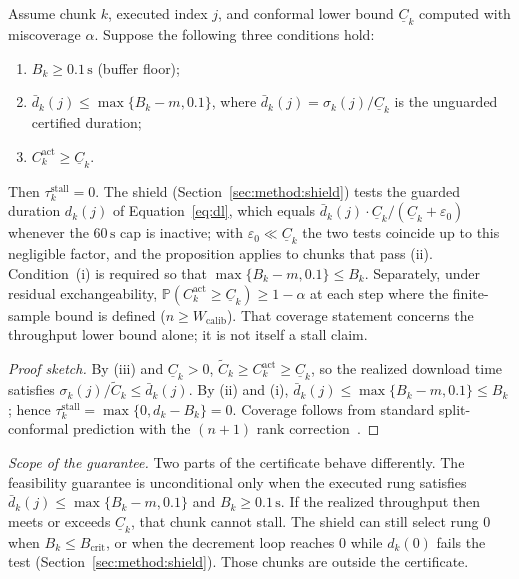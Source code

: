 \begin{proposition}
\label{prop:feas}
Assume chunk \(k\), executed index \(j\), and conformal lower bound \(\underline{C}_k\) computed with miscoverage \(\alpha\).
Suppose the following three conditions hold:
\begin{enumerate}
  \item[(i)] \(B_k\ge 0.1\,\mathrm{s}\) (buffer floor);
  \item[(ii)] \(\bar{d}_k(j)\le\max\{B_k-m,0.1\}\), where \(\bar{d}_k(j)=\sigma_k(j)/\underline{C}_k\) is the unguarded certified duration;
  \item[(iii)] \(C^{\mathrm{act}}_k\ge\underline{C}_k\).
\end{enumerate}
Then \(\tau^{\mathrm{stall}}_k=0\).
The shield (Section~\ref{sec:method:shield}) tests the guarded duration \(d_k(j)\) of Equation~\eqref{eq:dl}, which equals \(\bar{d}_k(j)\cdot\underline{C}_k/(\underline{C}_k+\varepsilon_0)\) whenever the \(60\,\mathrm{s}\) cap is inactive; with \(\varepsilon_0\ll\underline{C}_k\) the two tests coincide up to this negligible factor, and the proposition applies to chunks that pass (ii).
Condition~(i) is required so that \(\max\{B_k-m,0.1\}\le B_k\).
Separately, under residual exchangeability, \(\mathbb{P}(C^{\mathrm{act}}_k\ge\underline{C}_k)\ge 1-\alpha\) at each step where the finite-sample bound is defined (\(n\ge W_{\mathrm{calib}}\)).
That coverage statement concerns the throughput lower bound alone; it is not itself a stall claim.
\end{proposition}
\begin{proof}[Proof sketch]
By (iii) and \(\underline{C}_k>0\), \(\tilde{C}_k\ge C^{\mathrm{act}}_k\ge\underline{C}_k\), so the realized download time satisfies \(\sigma_k(j)/\tilde{C}_k\le\bar{d}_k(j)\). By (ii) and (i), \(\bar{d}_k(j)\le\max\{B_k-m,0.1\}\le B_k\); hence \(\tau^{\mathrm{stall}}_k=\max\{0,d_k-B_k\}=0\).
Coverage follows from standard split-conformal prediction with the \((n{+}1)\) rank correction~\cite{vovk2005algorithmic,angelopoulos2023gentle}.
\end{proof}

\emph{Scope of the guarantee.}
Two parts of the certificate behave differently.
The feasibility guarantee is unconditional only when the executed rung satisfies \(\bar{d}_k(j)\le\max\{B_k-m,0.1\}\) and \(B_k\ge 0.1\,\mathrm{s}\).
If the realized throughput then meets or exceeds \(\underline{C}_k\), that chunk cannot stall.
The shield can still select rung \(0\) when \(B_k\le B_{\mathrm{crit}}\), or when the decrement loop reaches \(0\) while \(d_k(0)\) fails the test (Section~\ref{sec:method:shield}).
Those chunks are outside the certificate.

